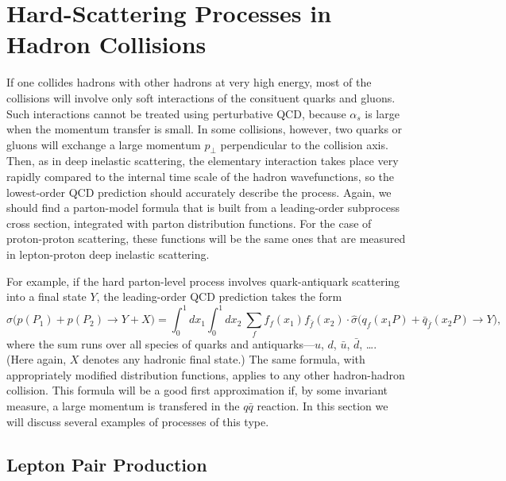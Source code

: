 \section{Hard-Scattering Processes in Hadron Collisions}

If one collides hadrons with other hadrons at very high energy, most of the
collisions will involve only soft interactions of the consituent quarks and
gluons.  Such interactions cannot be treated using perturbative QCD, because
$\alpha_s$ is large when the momentum transfer is small.  In some collisions,
however, two quarks or gluons will exchange a large momentum $p_\perp$
perpendicular to the collision axis.  Then, as in deep inelastic scattering,
the elementary interaction takes place very rapidly compared to the internal
time scale of the hadron wavefunctions, so the lowest-order QCD prediction
should accurately describe the process.  Again, we should find a parton-model
formula that is built from a leading-order subprocess cross section,
integrated with parton distribution functions.  For the case of proton-proton
scattering, these functions will be the same ones that are measured in
lepton-proton deep inelastic scattering.

For example, if the hard parton-level process involves quark-antiquark
scattering into a final state $Y$, the leading-order QCD prediction takes the
form
\begin{equation}
  \sigma\bigl( p(P_1) + p(P_2) \to Y + X \bigr)
  = \int_0^1 dx_1 \int_0^1 dx_2\ \sum_f f_f(x_1)f_{\bar{f}}(x_2)\cdot
    \hat{\sigma}\bigl( q_f(x_1P) + \bar{q}_{\bar{f}}(x_2P) \to Y \bigr) ,
  \label{eq:17.40}
\end{equation}
where the sum runs over all species of quarks and antiquarks---$u$, $d$,
$\bar{u}$, $\bar{d}$, \ldots.  (Here again, $X$ denotes any hadronic final
state.)  The same formula, with appropriately modified distribution
functions, applies to any other hadron-hadron collision.  This formula will
be a good first approximation if, by some invariant measure, a large momentum
is transfered in the $q\bar{q}$ reaction.  In this section we will discuss
several examples of processes of this type.

\subsection{Lepton Pair Production}

